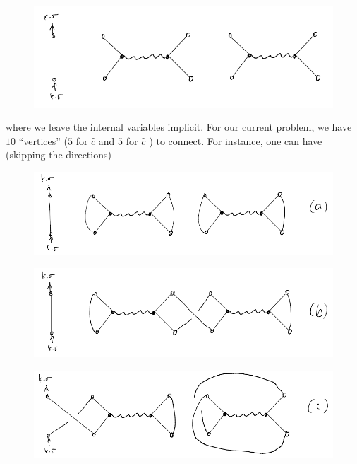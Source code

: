 \begin{figure}[H]
    \centering
    \includegraphics[width=\textwidth]{jupyterbook/data/fig/lec17-fig06.png}
\end{figure}

where we leave the internal variables implicit. For our current problem, we have $10$ ``vertices'' ($5$ for $\hat{c}$ and $5$ for $\hat{c}^\dagger$) to connect. For instance, one can have (skipping the directions)

\begin{figure}[H]
    \centering
    \includegraphics[width=\textwidth]{jupyterbook/data/fig/lec17-fig07.png}
\end{figure}

\begin{figure}[H]
    \centering
    \includegraphics[width=\textwidth]{jupyterbook/data/fig/lec17-fig08.png}
\end{figure}

\begin{figure}[H]
    \centering
    \includegraphics[width=\textwidth]{jupyterbook/data/fig/lec17-fig09.png}
\end{figure}

